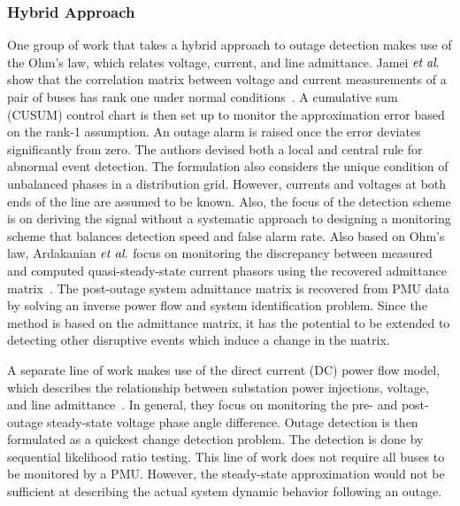 \subsubsection{Hybrid Approach}
One group of work that takes a hybrid approach to outage detection makes use of the Ohm’s law, which relates voltage, current, and line admittance. Jamei $\textit{et al}.$ show that the correlation matrix between voltage and current measurements of a pair of buses has rank one under normal conditions~\cite{Jamei2016,Jamei2017a}. A cumulative sum (CUSUM) control chart is then set up to monitor the approximation error based on the rank-1 assumption. An outage alarm is raised once the error deviates significantly from zero. The authors devised both a local and central rule for abnormal event detection. The formulation also considers the unique condition of unbalanced phases in a distribution grid. However, currents and voltages at both ends of the line are assumed to be known. Also, the focus of the detection scheme is on deriving the signal without a systematic approach to designing a monitoring scheme that balances detection speed and false alarm rate. 
Also based on Ohm’s law, Ardakanian $\textit{et al}.$ focus on monitoring the discrepancy between measured and computed quasi-steady-state current phasors using the recovered admittance matrix~\cite{ardakanian2017event,Ardakanian2019a}. The post-outage system admittance matrix is recovered from PMU data by solving an inverse power flow and system identification problem. Since the method is based on the admittance matrix, it has the potential to be extended to detecting other disruptive events which induce a change in the matrix.

A separate line of work makes use of the direct current (DC) power flow model, which describes the relationship between substation power injections, voltage, and line admittance~\cite{Chen2016,Babakmehr2016}. In general, they focus on monitoring the pre- and post-outage steady-state voltage phase angle difference. Outage detection is then formulated as a quickest change detection problem. The detection is done by sequential likelihood ratio testing. 
This line of work does not require all buses to be monitored by a PMU. However, the steady-state approximation would not be sufficient at describing the actual system dynamic behavior following an outage. 

